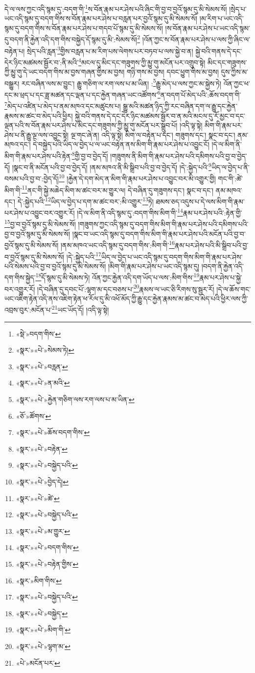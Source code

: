 དེ་ལ་ལས་ཀྱང་འདི་སྙམ་དུ་:བདག་གི་\footnote{«སྡེ་»བདག་གིས་}ས་བོན་རྣམ་པར་ཤེས་པའི་ཞིང་གི་བྱ་བ་བྱའོ་སྙམ་དུ་མི་སེམས་སོ། །སྲེད་པ་ཡང་འདི་སྙམ་དུ་བདག་གིས་ས་བོན་རྣམ་པར་ཤེས་པ་བརླན་པར་བྱའོ་སྙམ་དུ་མི་སེམས་སོ། །མ་རིག་པ་ཡང་འདི་སྙམ་དུ་བདག་གིས་ས་བོན་རྣམ་པར་ཤེས་པ་གདབ་པོ་སྙམ་དུ་མི་སེམས་སོ། །ས་བོན་རྣམ་པར་ཤེས་པ་ཡང་འདི་སྙམ་དུ་བདག་ནི་རྐྱེན་འདི་དག་གིས་བསྐྱེད་དོ་སྙམ་དུ་མི་:སེམས་སོ།\footnote{«སྣར་»«པེ་»སེམས་ཏེ།} །འོན་ཀྱང་ས་བོན་རྣམ་པར་ཤེས་པ་ལས་ཀྱི་ཞིང་ལ་བརྟེན་པ། སྲེད་པའི་རླན་\footnote{«སྣར་»«པེ་»བརླན་}གྱིས་བརླན་པ་མ་རིག་པས་ལེགས་པར་བཏབ་པ་ལས་སྐྱེ་བ་ན། སྐྱེ་བའི་གནས་དེ་དང་དེར་ཉིང་མཚམས་སྦྱོར་བ་:ནི་མའི་\footnote{«སྣར་»«པེ་»ན་མའི་}མངལ་དུ་མིང་དང་གཟུགས་ཀྱི་མྱུ་གུ་མངོན་པར་འགྲུབ་སྟེ། མིང་དང་གཟུགས་ཀྱི་མྱུ་གུ་དེ་ཡང་བདག་གིས་མ་བྱས་གཞན་གྱིས་མ་བྱས། གཉི་གས་མ་བྱས། དབང་ཕྱུག་གིས་མ་བྱས། དུས་ཀྱིས་མ་བསྒྱུར། རང་བཞིན་ལས་མ་བྱུང་། རྒྱུ་གཅིག་ལ་རག་ལས་པ་མ་ཡིན། :\footnote{«སྣར་»«པེ་»རྐྱེན་གཅིག་ལས་རག་ལས་པ་མ་ཡིན་}རྒྱུ་མེད་པ་ལས་ཀྱང་མ་སྐྱེས་ཏེ། འོན་ཀྱང་ཕ་དང་མ་ཕྲད་པ་དང་ཟླ་མཚན་དང་ལྡན་པ་དང་རྐྱེན་གཞན་ཡང་འཚོགས་\footnote{«ཅོ་»ཚོགས་}ན་བདག་པོ་མེད་པའི་:ཆོས་བདག་གི་\footnote{«སྣར་»«པེ་»ཆོས་བདག་གིས་}མེད་པ་འཛིན་པ་མེད་པ་ནམ་མཁའ་དང་མཚུངས་པ། སྒྱུ་མའི་མཚན་ཉིད་ཀྱི་རང་བཞིན་དག་ལ་རྒྱུ་དང་རྐྱེན་རྣམས་མ་ཚང་བ་མེད་པའི་ཕྱིར། སྐྱེ་བའི་གནས་དེ་དང་དེར་ཉིང་མཚམས་སྦྱོར་བ་ན་མའི་མངལ་དུ་རོ་མྱང་བ་དང་ལྡན་པའི་ས་བོན་རྣམ་པར་ཤེས་པ་མིང་དང་གཟུགས་ཀྱི་མྱུ་གུ་མངོན་པར་སྒྲུབ་པོ། །འདི་ལྟ་སྟེ། མིག་གི་རྣམ་པར་ཤེས་པ་ནི་རྒྱུ་ལྔ་ལས་འབྱུང་སྟེ། ལྔ་གང་ཞེ་ན། འདི་ལྟ་སྟེ། མིག་ལ་བརྟེན་པ་དང་། གཟུགས་དང་། སྣང་བ་དང་། ནམ་མཁའ་དང་། དེ་བསྐྱེད་པའི་ཡིད་ལ་བྱེད་པ་ལ་ཡང་བརྟེན་ནས་མིག་གི་རྣམ་པར་ཤེས་པ་འབྱུང་ངོ། །དེ་ལ་མིག་ནི་མིག་གི་རྣམ་པར་ཤེས་པའི་རྟེན་\footnote{«སྣར་»«པེ་»བརྟེན་}གྱི་བྱ་བ་བྱེད་དོ། །གཟུགས་ནི་མིག་གི་རྣམ་པར་ཤེས་པའི་དམིགས་པའི་བྱ་བ་བྱེད་དོ། །སྣང་བ་ནི་མངོན་པའི་བྱ་བ་བྱེད་དོ། །ནམ་མཁའ་ནི་མི་སྒྲིབ་པའི་བྱ་བ་བྱེད་དོ། །དེ་:སྐྱེད་པའི་\footnote{«སྣར་»«པེ་»བསྐྱེད་པའི་}ཡིད་ལ་བྱེད་པ་ནི་བསམ་པའི་བྱ་བ་:བྱེད་དོ།\footnote{«སྣར་»«པེ་»བྱེད་དེ།} །རྐྱེན་དེ་དག་མེད་ན་མིག་གི་རྣམ་པར་ཤེས་པ་འབྱུང་བར་མི་འགྱུར་གྱི། གང་གི་:ཚེ་མིག་གི་\footnote{«སྣར་»«པེ་»ཚེ་}ནང་གི་སྐྱེ་མཆེད་མིག་མ་ཚང་བར་མ་གྱུར་ལ། དེ་བཞིན་དུ་གཟུགས་དང་། སྣང་བ་དང་། ནམ་མཁའ་དང་། དེ་:སྐྱེད་པའི་\footnote{«སྣར་»«པེ་»བསྐྱེད་པའི་}ཡིད་ལ་བྱེད་པ་དག་མ་ཚང་བར་:མི་འགྱུར་\footnote{«སྣར་»«པེ་»མ་གྱུར་}ཏེ། ཐམས་ཅད་འདུས་པ་དེ་ལས་མིག་གི་རྣམ་པར་ཤེས་པ་འབྱུང་བར་འགྱུར་རོ། །དེ་ལ་མིག་ནི་འདི་སྙམ་དུ་:བདག་གིས་མིག་གི་\footnote{«སྣར་»«པེ་»བདག་གིས་}རྣམ་པར་ཤེས་པའི་:རྟེན་གྱི་\footnote{«སྣར་»«པེ་»བརྟེན་གྱིས་}བྱ་བ་བྱའོ་སྙམ་དུ་མི་སེམས་སོ། །གཟུགས་ཀྱང་འདི་སྙམ་དུ་བདག་གིས་མིག་གི་རྣམ་པར་ཤེས་པའི་དམིགས་པའི་བྱ་བ་བྱའོ་སྙམ་དུ་མི་སེམས་སོ། །སྣང་བ་ཡང་འདི་སྙམ་དུ་བདག་གིས་མིག་གི་རྣམ་པར་ཤེས་པའི་མངོན་པའི་བྱ་བ་བྱའོ་སྙམ་དུ་མི་སེམས་སོ། །ནམ་མཁའ་ཡང་འདི་སྙམ་དུ་བདག་གིས་:མིག་གི་\footnote{«སྣར་»མིག་གིས་}རྣམ་པར་ཤེས་པའི་མི་སྒྲིབ་པའི་བྱ་བ་བྱའོ་སྙམ་དུ་མི་སེམས་སོ། །དེ་:སྐྱེད་པའི་\footnote{«སྣར་»«པེ་»བསྐྱེད་པའི་}ཡིད་ལ་བྱེད་པ་ཡང་འདི་སྙམ་དུ་བདག་གིས་མིག་གི་རྣམ་པར་ཤེས་པའི་སེམས་པའི་བྱ་བ་བྱའོ་སྙམ་དུ་མི་སེམས་སོ། །མིག་གི་རྣམ་པར་ཤེས་པ་ཡང་འདི་སྙམ་དུ། །བདག་ནི་རྐྱེན་འདི་དག་གིས་སྐྱེད་\footnote{«སྣར་»«པེ་»བསྐྱེད་}དོ་སྙམ་དུ་མི་སེམས་ཏེ། འོན་ཀྱང་རྐྱེན་འདི་དག་ཡོད་པ་ལས་:མིག་གིས་\footnote{«སྣར་»«པེ་»མིག་གི་}རྣམ་པར་ཤེས་པ་སྐྱེ་བར་འགྱུར་རོ། །དེ་བཞིན་དུ་དབང་པོ་:ལྷག་མ་དང་བཅས་པ་\footnote{«སྣར་»«པེ་»ལྷག་མ་}རྣམས་ལ་ཡང་ཅི་རིགས་སུ་སྦྱར་རོ། །དེ་ལ་ཆོས་གང་ཡང་འཇིག་རྟེན་འདི་ནས་འཇིག་རྟེན་ཕ་རོལ་དུ་མི་འཕོ་མོད་ཀྱི་རྒྱུ་དང་རྐྱེན་རྣམས་མ་ཚང་བ་མེད་པའི་ཕྱིར་ལས་ཀྱི་འབྲས་བུར་:མངོན་པ་\footnote{«པེ་»མངོན་པར་}ཡང་ཡོད་དོ། །འདི་ལྟ་སྟེ། 